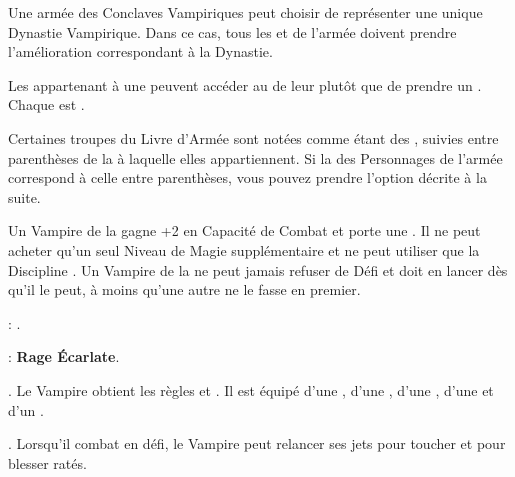 \closearmyspecialrules



Une armée des Conclaves Vampiriques peut choisir de représenter une unique Dynastie Vampirique. Dans ce cas, tous les \vampirelords{} et \vampireheroes{} de l'armée doivent prendre l'amélioration correspondant à la Dynastie.


Les \vampirelords{} appartenant à une \bloodline{} peuvent accéder au \ancientbloodpower{} de leur \bloodline{} plutôt que de prendre un \bloodpower{}. Chaque \ancientbloodpower{} est \oneofakind{}.


Certaines troupes du Livre d'Armée sont notées comme étant des \bloodties{}, suivies entre parenthèses de la \bloodline{} à laquelle elles appartiennent. Si la \bloodline{} des Personnages \vampires{} de l'armée correspond à celle entre parenthèses, vous pouvez prendre l'option décrite à la suite.


Un Vampire de la \brotherhood{} gagne +2 en Capacité de Combat et porte une \platearmour{}. Il ne peut acheter qu'un seul Niveau de Magie supplémentaire et ne peut utiliser que la Discipline \necromancy{}. Un Vampire de la \brotherhood{} ne peut jamais refuser de Défi et doit en lancer dès qu'il le peut, à moins qu'une autre  ne le fasse en premier.

\bloodtie{} : \textbf{\vampireknights{}}.

\ancientbloodpower{} : \textbf{Rage Écarlate}\dotfill{}.\newline%







 \textbf{\bloodlinepower}. Le Vampire obtient les règles \weaponmaster{} et . Il est équipé d'une \ahw{}, d'une \halberd{}, d'une \gw{}, d'une \lance{} et d'un \shield{}.

 \textbf{\bloodlinepower}. Lorsqu'il combat en défi, le Vampire peut relancer ses jets pour toucher et pour blesser ratés.


